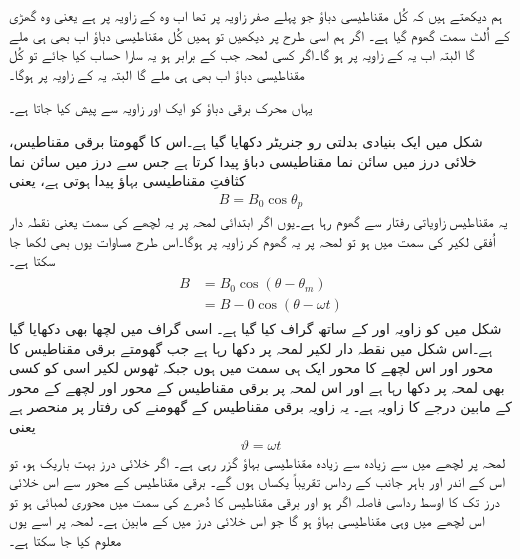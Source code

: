 ہم دیکھتے ہیں کہ کُل مقناطیسی دباؤ جو پہلے صفر زاویہ پر تھا اب وہ   کے زاویہ پر ہے یعنی وہ گھڑی کے اُلٹ سمت گھوم گیا ہے۔ اگر ہم اسی طرح  پر دیکھیں تو ہمیں کُل مقناطیسی دباؤ اب بھی  ہی ملے گا البتہ اب یہ  کے زاویہ پر ہو گا۔اگر کسی لمحہ جب  کے برابر ہو یہ سارا حساب کیا جائے تو کُل مقناطیسی دباؤ اب بھی  ہی ملے گا البتہ یہ  کے زاویہ پر ہوگا۔

یہاں محرک برقی دباؤ کو ایک اور زاویہ سے پیش کیا جاتا ہے۔

شکل  میں ایک بنیادی بدلتی رو جنریٹر دکھایا گیا ہے۔اس کا گھومتا برقی مقناطیس، خلائی درز میں سائن نما مقناطیسی دباؤ  پیدا کرتا ہے جس سے  درز میں سائن نما کثافتِ مقناطیسی بہاؤ   پیدا ہوتی ہے، یعنی
\begin{align}
B=B_0 \cos \theta_p
\end{align}
یہ مقناطیس  زاویاتی رفتار سے گھوم رہا ہے۔یوں اگر ابتدائی لمحہ   پر  یہ  لچھے کی سمت یعنی نقطہ دار اُفقی لکیر کی سمت میں ہو تو لمحہ   پر یہ گھوم کر زاویہ  پر ہوگا۔اس طرح مساوات   یوں بھی لکھا جا سکتا ہے۔
\begin{gather}
\begin{aligned}
B&=B_0 \cos (\theta-\theta_m)\\
&=B-0 \cos (\theta -\omega t)
\end{aligned}
\end{gather}
شکل  میں  کو زاویہ  اور   کے ساتھ گراف کیا گیا ہے۔ اسی گراف میں لچھا  بھی دکھایا گیا ہے۔اس شکل میں نقطہ دار لکیر لمحہ  پر  دکھا رہا ہے جب گھومتے برقی مقناطیس کا محور اور اس لچھے کا محور ایک ہی سمت میں ہوں جبکہ ٹھوس لکیر اسی  کو کسی  بھی لمحہ  پر دکھا رہا ہے اور اس لمحہ پر برقی مقناطیس کے محور اور لچھے کے محور کے مابین  درجے کا زاویہ ہے۔ یہ زاویہ برقی مقناطیس کے گھومنے کی رفتار  پر منحصر ہے یعنی
\begin{align}
\vartheta=\omega t
\end{align}
لمحہ  پر لچھے میں سے زیادہ سے زیادہ مقناطیسی بہاؤ گزر رہی ہے۔ اگر خلائی درز بہت باریک ہو، تو اس کے اندر اور باہر جانب کے رداس تقریباً یکساں ہوں گے۔ برقی مقناطیس کے محور سے اس خلائی درز تک کا اوسط رداسی فاصلہ اگر  ہو اور برقی مقناطیس کا دُھرے کی سمت میں محوری لمبائی  ہو تو اس لچھے میں وہی مقناطیسی بہاؤ ہو گا جو اس خلائی درز میں    کے مابین ہے۔ لمحہ  پر اسے یوں معلوم کیا جا سکتا ہے۔
